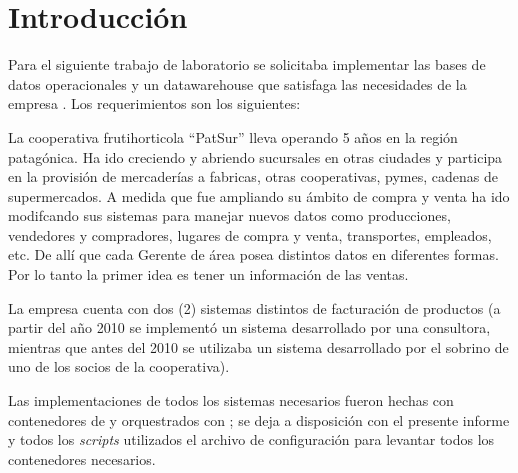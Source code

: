 







\clearpage
\tableofcontents
\clearpage 

\lstset{style=sql}

\section{Introducción}

Para el siguiente trabajo de laboratorio se solicitaba implementar las bases de datos operacionales y un datawarehouse que satisfaga las necesidades de la empresa . Los requerimientos son los siguientes:

\begin{displayquote}\itshape

La cooperativa frutihorticola “PatSur” lleva operando 5 años en la región patagónica. Ha ido creciendo y abriendo sucursales en otras ciudades y participa en la provisión de mercaderías a fabricas, otras cooperativas, pymes, cadenas de supermercados. A medida que fue ampliando su ámbito de compra y venta ha ido modifcando sus sistemas para manejar nuevos datos como producciones, vendedores y compradores, lugares de compra y venta, transportes, empleados, etc. De allí que cada Gerente de área posea distintos datos en diferentes formas. Por lo tanto la primer idea es tener un información de las ventas. 

La empresa cuenta con dos (2) sistemas distintos de facturación de productos (a partir del año 2010 se implementó un sistema desarrollado por una consultora, mientras que antes del 2010 se utilizaba un sistema desarrollado por el sobrino de uno de los socios de la cooperativa).  

\end{displayquote}

Las implementaciones de todos los sistemas necesarios fueron hechas con contenedores de \docker{} y orquestrados con \doccom{}; se deja a disposición con el presente informe y todos los \emph{scripts} utilizados el archivo de configuración para levantar todos los contenedores necesarios. 

